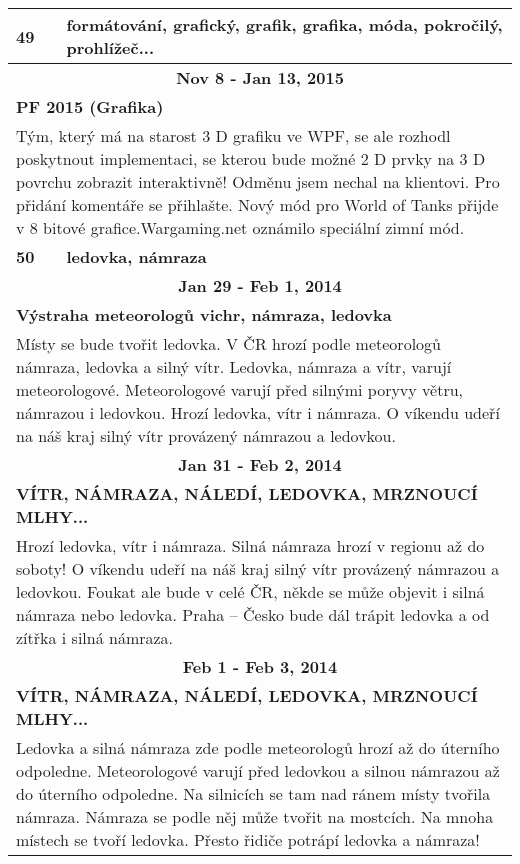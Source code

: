 \begin{tabularx}{\linewidth}{l l}
            \bf 49 & \bf formátování, grafický, grafik, grafika, móda, pokročilý, prohlížeč... \\ \midrule
            
                \multicolumn{2}{c}{\bf Nov 8 - Jan 13, 2015} \\
                \multicolumn{2}{p{\linewidth}}{\bf PF 2015 (Grafika)} \\
                \multicolumn{2}{p{\linewidth}}{Tým, který má na starost 3 D grafiku ve WPF, se ale rozhodl poskytnout implementaci, se kterou bude možné 2 D prvky na 3 D povrchu zobrazit interaktivně! Odměnu jsem nechal na klientovi. Pro přidání komentáře se přihlašte. Nový mód pro World of Tanks přijde v 8 bitové grafice.Wargaming.net oznámilo speciální zimní mód.} \\ \midrule
                [1.5pt]

            \bf 50 & \bf ledovka, námraza \\ \midrule
            
                \multicolumn{2}{c}{\bf Jan 29 - Feb 1, 2014} \\
                \multicolumn{2}{p{\linewidth}}{\bf Výstraha meteorologů vichr, námraza, ledovka} \\
                \multicolumn{2}{p{\linewidth}}{Místy se bude tvořit ledovka. V ČR hrozí podle meteorologů námraza, ledovka a silný vítr. Ledovka, námraza a vítr, varují meteorologové. Meteorologové varují před silnými poryvy větru, námrazou i ledovkou. Hrozí ledovka, vítr i námraza. O víkendu udeří na náš kraj silný vítr provázený námrazou a ledovkou.} \\ \midrule
                
                \multicolumn{2}{c}{\bf Jan 31 - Feb 2, 2014} \\
                \multicolumn{2}{p{\linewidth}}{\bf VÍTR, NÁMRAZA, NÁLEDÍ, LEDOVKA, MRZNOUCÍ MLHY...} \\
                \multicolumn{2}{p{\linewidth}}{Hrozí ledovka, vítr i námraza. Silná námraza hrozí v regionu až do soboty! O víkendu udeří na náš kraj silný vítr provázený námrazou a ledovkou. Foukat ale bude v celé ČR, někde se může objevit i silná námraza nebo ledovka. Praha – Česko bude dál trápit ledovka a od zítřka i silná námraza.} \\ \midrule
                
                \multicolumn{2}{c}{\bf Feb 1 - Feb 3, 2014} \\
                \multicolumn{2}{p{\linewidth}}{\bf VÍTR, NÁMRAZA, NÁLEDÍ, LEDOVKA, MRZNOUCÍ MLHY...} \\
                \multicolumn{2}{p{\linewidth}}{Ledovka a silná námraza zde podle meteorologů hrozí až do úterního odpoledne. Meteorologové varují před ledovkou a silnou námrazou až do úterního odpoledne. Na silnicích se tam nad ránem místy tvořila námraza. Námraza se podle něj může tvořit na mostcích. Na mnoha místech se tvoří ledovka. Přesto řidiče potrápí ledovka a námraza!} \\ \midrule
                

\end{tabularx}
